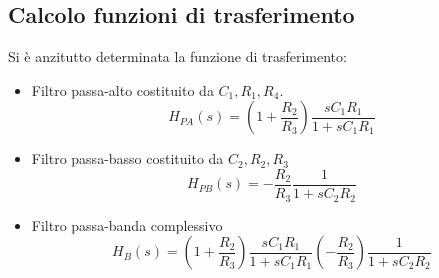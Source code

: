 \subsection{Calcolo funzioni di trasferimento}
Si è anzitutto determinata la funzione di trasferimento:
\begin{itemize}
    \item Filtro passa-alto costituito da $C_1,R_1,R_4$. 
    \begin{equation}
        H_{PA}(s)=\left(1+\frac{R_2}{R_3}\right)\frac{sC_1R_1}{1+sC_1R_1}
    \end{equation}
    \item Filtro passa-basso costituito da $C_2,R_2,R_3$
    \begin{equation}
        H_{PB}(s)=-\frac{R_2}{R_3}\frac{1}{1+sC_2R_2}
    \end{equation}
    \item Filtro passa-banda complessivo
    \begin{equation*}
        H_{B}(s)=\left(1+\frac{R_2}{R_3}\right)\frac{sC_1R_1}{1+sC_1R_1}(-\frac{R_2}{R_3})\frac{1}{1+sC_2R_2}
    \end{equation*}
\end{itemize}
